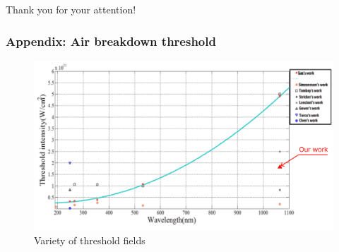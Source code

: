 \documentclass{beamer}
\begin{document}
	\begin{frame}[plain,c]
		
		\begin{center}
			\huge {} Thank you for your attention!
		\end{center}
		
	\end{frame}

	\begin{frame}
		\frametitle{Appendix: Air breakdown threshold}
		
		\begin{figure}
			\centering
			\includegraphics[width=\linewidth]{res/air_threshold_variety.png}
			\caption*{Variety of threshold fields}
		\end{figure}
	\end{frame}
\end{document}
